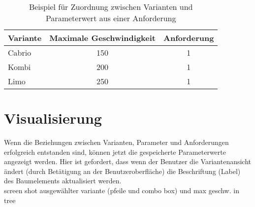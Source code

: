 \begin{table}[h]
\begin{center}
	\begin{tabular}{|l||c|c|}
	 \hline
	 Variante &Maximale Geschwindigkeit &Anforderung\\
	 \hline\hline
	 Cabrio   &150                      & 1\\
	 \hline
	 Kombi    &200                      & 1\\
	 \hline
	 Limo     &250                      & 1\\
	 \hline
	\end{tabular}
	
	\caption{Beispiel für Zuordnung zwischen Varianten und Parameterwert aus einer Anforderung}
	\label{table:4TestCases}
\end{center}
\end{table}


\newpage
\section{Visualisierung}
\paragraph{}


Wenn die Beziehungen zwischen Varianten, Parameter und Anforderungen erfolgreich entstanden sind, können jetzt die gespeicherte Parameterwerte angezeigt werden. Hier ist gefordert, dass wenn der Benutzer die Variantenansicht ändert (durch Betätigung an der Benutzeroberfläche) die Beschriftung (Label) des Baumelements aktualisiert werden.\\

screen shot ausgewählter variante (pfeile und combo box) und max geschw. in tree \\

